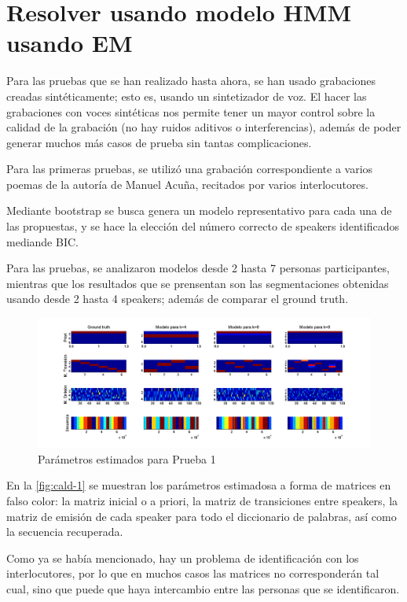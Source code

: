 \section{Resolver usando modelo HMM usando EM} 
\label{sec:sd-hmm-em}

Para las pruebas que se han realizado hasta ahora, se han usado grabaciones creadas sintéticamente; esto es, usando un sintetizador de voz. El hacer las grabaciones con voces sintéticas nos permite tener un mayor control sobre la calidad de la grabación (no hay ruidos aditivos o interferencias), además de poder generar muchos más casos de prueba sin tantas complicaciones.

Para las primeras pruebas, se utilizó una grabación correspondiente a varios poemas de la autoría de Manuel Acuña, recitados por varios interlocutores.

Mediante bootstrap se busca genera un modelo representativo para cada una de las propuestas, y  se hace la elección del número correcto de speakers identificados mediande BIC.

Para las pruebas, se analizaron modelos desde 2 hasta 7 personas participantes, mientras que los resultados que se prensentan son las segmentaciones obtenidas usando desde 2 hasta 4 speakers; además de comparar el ground truth.

\begin{figure}[bth]
  \centerline
  {\includegraphics[width=1.7\linewidth]{gfx/chap5/cuerv-1}} \quad
  \caption{Parámetros estimados para Prueba 1}
  \label{fig:cald-1}
\end{figure}

En la \autoref{fig:cald-1} se muestran los parámetros estimadosa a forma de matrices en falso color: la matriz inicial o a priori, la matriz de transiciones entre speakers, la matriz de emisión de cada speaker para todo el diccionario de palabras, así como la secuencia recuperada.

Como ya se había mencionado, hay un problema de identificación con los interlocutores, por lo que en muchos casos las matrices no corresponderán tal cual, sino que puede que haya intercambio entre las personas que se identificaron.

